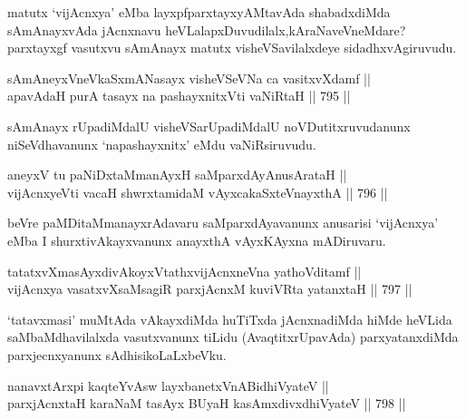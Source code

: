 \begin{artha}
matutx `vijAcnxya' eMba layxpfparxtayxyAMtavAda shabadxdiMda sAmAnayxvAda jAcnxnavu heVLalapxDuvudilalx,kAraNaveVneMdare? parxtayxgf vasutxvu sAmAnayx matutx visheVSavilalxdeye sidadhxvAgiruvudu.
\end{artha}


\begin{shl}
sAmAneyxVneVkaSxmANasayx visheVSeVNa ca vasitxvXdamf || \\
apavAdaH purA tasayx na pashayxnitxVti vaNiRtaH \hfill || 795 ||  
\end{shl}

\begin{artha}
sAmAnayx rUpadiMdalU visheVSarUpadiMdalU noVDutitxruvudanunx niSeVdhavanunx `napashayxnitx' eMdu vaNiRsiruvudu.
\end{artha}


\begin{shl}
aneyxV tu paNiDxtaMmanAyxH saMparxdAyAnusArataH || \\
vijAcnxyeVti vacaH shwrxtamidaM vAyxcakaSxteV\s nayxthA \hfill || 796 ||  
\end{shl}

\begin{artha}
beVre paMDitaMmanayxrAdavaru saMparxdAyavanunx anusarisi `vijAcnxya' eMba I shurxtivAkayxvanunx anayxthA vAyxKAyxna mADiruvaru.
\end{artha}


\begin{shl}
tatatxvXmasAyxdivAkoyxVtathxvijAcnxneVna yathoVditamf || \\
vijAcnxya vasatxvXsaMsagiR parxjAcnxM kuviVRta yatanxtaH \hfill || 797 ||  
\end{shl}

\begin{artha}
`tatavxmasi' muMtAda vAkayxdiMda huTiTxda jAcnxnadiMda hiMde heVLida saMbaMdhavilalxda vasutxvanunx tiLidu (AvaqtitxrUpavAda) parxyatanxdiMda parxjecnxyanunx sAdhisikoLaLxbeVku.
\end{artha}


\begin{shl}
nanavxtArxpi kaqteYvAsw layxbanetxVnABidhiVyateV || \\
parxjAcnx\s taH karaNaM tasAyx BUyaH kasAmxdivxdhiVyateV \hfill || 798 ||  
\end{shl}

